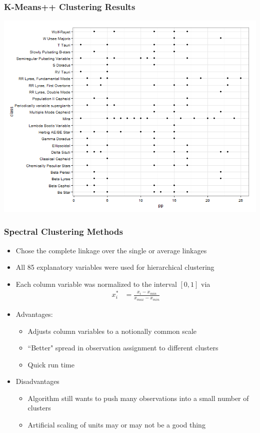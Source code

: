 \documentclass{beamer}
\begin{document}

\begin{frame}
\frametitle{K-Means++ Clustering Results}
\begin{center}
\includegraphics[scale=.4]{pp.png}
\end{center}
\end{frame}


\begin{frame}
	\frametitle{Spectral Clustering Methods}
		\begin{itemize}
			\item Chose the complete linkage over the single or average linkages
			\item All 85 explanatory variables were used for hierarchical clustering
			\item Each column variable was normalized to the interval $[0,1]$ via
				\begin{align*}
					x_i^{*} &= \frac{x_i-x_{min}}{x_{max}-x_{min}}
				\end{align*}
			\item Advantages:
			\begin{itemize}
				\item Adjusts column variables to a notionally common scale
				\item ``Better" spread in observation assignment to different clusters
				\item Quick run time
			\end{itemize}
			\item Disadvantages
			\begin{itemize}
				\item Algorithm still wants to push many observations into a small number of clusters
				\item Artificial scaling of units may or may not be a good thing
			\end{itemize}
		\end{itemize}
\end{frame}
\end{document}
